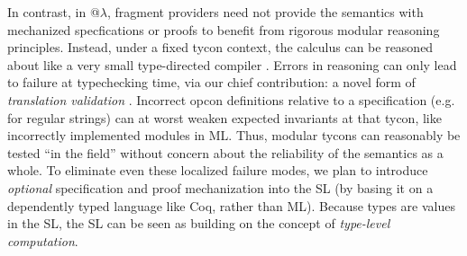 \documentclass[pldi]{sigplanconf-pldi15}
\begin{document}
In contrast, in @$\lambda$, fragment providers need not provide the semantics with mechanized specfications or proofs to benefit from rigorous modular reasoning principles. Instead, under a fixed tycon context, the calculus can be reasoned about like a very small type-directed compiler \cite{tarditi+:til-OLD,conf/pldi/Chlipala07}. Errors in reasoning can only lead to failure at typechecking time, via our chief contribution: a novel form of \emph{translation validation} \cite{Pnueli-Siegel-Singerman98}. Incorrect opcon definitions relative to a specification (e.g. \cite{sanitation-psp14} for regular strings) can at worst weaken expected invariants at that tycon, like incorrectly implemented modules in ML. Thus, modular tycons can reasonably be tested ``in the field'' without concern about the reliability of the semantics as a whole. 
To eliminate even these localized failure modes, we plan to introduce \emph{optional} specification and proof mechanization into the SL (by basing it on a dependently typed language like Coq, rather than ML). Because types are values in the SL, the SL can be seen as building on the concept of \emph{type-level computation}. %
\end{document}
